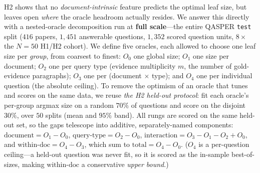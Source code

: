 \documentclass[11pt]{article}
\begin{document}
H2 shows that no \emph{document-intrinsic} feature predicts the optimal leaf size,
but leaves open \emph{where} the oracle headroom actually resides. We answer this
directly with a nested-oracle decomposition run at \textbf{full scale}---the entire
QASPER \texttt{test} split ($416$ papers, $1{,}451$ answerable questions, $1{,}352$
scored question units, $8\times$ the $N{=}50$ H1/H2 cohort). We define five oracles,
each allowed to choose one leaf size per \emph{group}, from coarsest to finest:
$O_0$ one global size; $O_1$ one size per document; $O_2$ one per query type
(evidence multiplicity $m$, the number of gold-evidence paragraphs); $O_3$ one per
(document $\times$ type); and $O_4$ one per individual question (the absolute
ceiling). To remove the optimism of an oracle that tunes and scores on the same
data, we reuse \emph{the H2 held-out protocol}: fit each oracle's per-group argmax
size on a random $70\%$ of questions and score on the disjoint $30\%$, over $50$
splits (mean and $95\%$ band). All rungs are scored on the same held-out set, so the
gaps telescope into additive, separately-named components:
$\mathrm{document}=O_1-O_0$, $\mathrm{query\text{-}type}=O_2-O_0$,
$\mathrm{interaction}=O_3-O_1-O_2+O_0$, and $\mathrm{within\text{-}doc}=O_4-O_3$,
which sum to $\mathrm{total}=O_4-O_0$. ($O_4$ is a per-question ceiling---a held-out
question was never fit, so it is scored as the in-sample best-of-sizes, making
$\mathrm{within\text{-}doc}$ a conservative \emph{upper bound}.)
\end{document}
